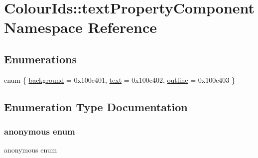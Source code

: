 \hypertarget{namespaceColourIds_1_1textPropertyComponent}{}\section{Colour\+Ids\+:\+:text\+Property\+Component Namespace Reference}
\label{namespaceColourIds_1_1textPropertyComponent}
\subsection*{Enumerations}
\begin{DoxyCompactItemize}
\item 
enum \{ \mbox{\hyperlink{namespaceColourIds_1_1textPropertyComponent_ae4da199e76f7f372fda37b2b3813bdb6a94eebf2e06090956b385f2e1a86b81a9}{background}} = 0x100e401, 
\mbox{\hyperlink{namespaceColourIds_1_1textPropertyComponent_ae4da199e76f7f372fda37b2b3813bdb6aace57cd85ae3cefa2c6bc5b1deffa0be}{text}} = 0x100e402, 
\mbox{\hyperlink{namespaceColourIds_1_1textPropertyComponent_ae4da199e76f7f372fda37b2b3813bdb6a7f75156f29673e918418d8f4ef3b2370}{outline}} = 0x100e403
 \}
\end{DoxyCompactItemize}


\subsection{Enumeration Type Documentation}
\mbox{\label{namespaceColourIds_1_1textPropertyComponent_ae4da199e76f7f372fda37b2b3813bdb6}} 
\subsubsection{\texorpdfstring{anonymous enum}{anonymous enum}}
{\footnotesize\ttfamily anonymous enum}

